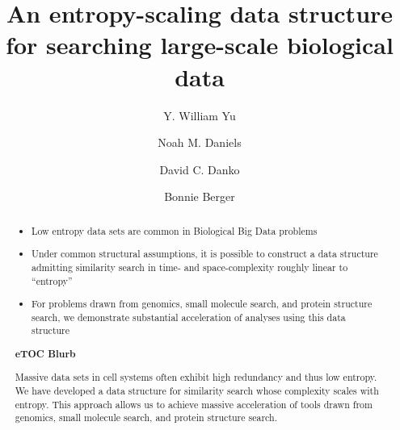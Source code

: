 \documentclass[review,preprint,12pt]{elsarticle}
\theoremstyle{definition}
\theoremstyle{remark}
\numberwithin{equation}{section}
\begin{document}
\begin{frontmatter}

\title{ %
An entropy-scaling data structure for searching large-scale biological data}

\author[mitmath,mitcsail]{Y. William Yu}
\author[mitmath,mitcsail]{Noah M. Daniels}
\author[mitcsail]{David C. Danko}
\author[mitmath,mitcsail]{Bonnie Berger}
\address[mitmath]{Department of Mathematics, Massachusetts Institute of Technology, Cambridge, Massachusetts 02139}
\address[mitcsail]{Computer Science and AI Lab, Massachusetts Institute of Technology, Cambridge, Massachusetts 02139}






\begin{abstract}
    \begin{itemize}
        \item Low entropy data sets are common in Biological Big Data problems
        \item Under common structural assumptions, it is possible to construct a data structure admitting similarity search in time- and space-complexity roughly linear to ``entropy''
        \item For problems drawn from genomics, small molecule search, and protein structure search, we demonstrate substantial acceleration of analyses using this data structure
    \end{itemize}
\noindent\unskip\textbf{eTOC Blurb}
\par\medskip\noindent\unskip\ignorespaces
Massive data sets in cell systems often exhibit high redundancy and thus low entropy.
We have developed a data structure for similarity search whose complexity scales with entropy.
This approach allows us to achieve massive acceleration of tools drawn from genomics, small molecule search, and protein structure search.
\end{abstract}

\end{frontmatter}
\end{document}
